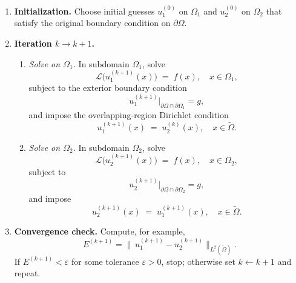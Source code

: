 \documentclass[12pt]{article}
\begin{document}
\begin{enumerate}
  \item \textbf{Initialization.}  Choose initial guesses \(u_1^{(0)}\) on \(\Omega_1\) and \(u_2^{(0)}\) on \(\Omega_2\) that satisfy the original boundary condition on \(\partial\Omega\).

  \item \textbf{Iteration \(k\to k+1\).}
  \begin{enumerate}
    \item \emph{Solve on \(\Omega_1\).}  In subdomain \(\Omega_1\), solve
    \begin{equation}
      \mathcal{L}\bigl(u_1^{(k+1)}(x)\bigr) \;=\; f(x),
      \quad x\in \Omega_1,
    \end{equation}
    subject to the exterior boundary condition 
    \begin{equation}
      u_1^{(k+1)}\bigl|_{\partial\Omega\cap\partial\Omega_1} = g,
    \end{equation}
    and impose the overlapping‐region Dirichlet condition
    \begin{equation}
      u_1^{(k+1)}(x) \;=\; u_2^{(k)}(x), 
      \quad x\in \widetilde\Omega.
    \end{equation}
    \item \emph{Solve on \(\Omega_2\).}  In subdomain \(\Omega_2\), solve
    \begin{equation}
      \mathcal{L}\bigl(u_2^{(k+1)}(x)\bigr) \;=\; f(x),
      \quad x\in \Omega_2,
    \end{equation}
    subject to
    \begin{equation}
      u_2^{(k+1)}\bigl|_{\partial\Omega\cap\partial\Omega_2} = g,
    \end{equation}
    and impose
    \begin{equation}
      u_2^{(k+1)}(x) \;=\; u_1^{(k+1)}(x), 
      \quad x\in \widetilde\Omega.
    \end{equation}
  \end{enumerate}

  \item \textbf{Convergence check.}  Compute, for example,
  \begin{equation}
    E^{(k+1)} 
    = \bigl\lVert\,u_1^{(k+1)} - u_2^{(k+1)}\bigr\rVert_{L^2(\widetilde\Omega)}.
  \end{equation}
  If \(E^{(k+1)} < \varepsilon\) for some tolerance \(\varepsilon > 0\), stop; otherwise set \(k \leftarrow k+1\) and repeat.
\end{enumerate}
\end{document}
